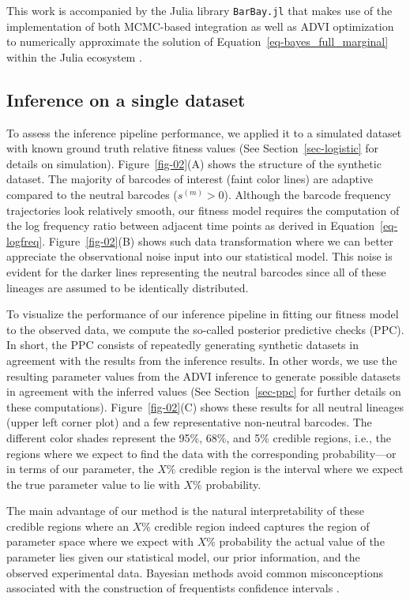 \documentclass[
]{scrartcl}
\begin{document}
\begin{refsegment}
This work is accompanied by the Julia library \texttt{BarBay.jl} that
makes use of the implementation of both MCMC-based integration as well
as ADVI optimization to numerically approximate the solution of
Equation~\ref{eq-bayes_full_marginal} within the Julia ecosystem
\autocite{ge2018}.

\hypertarget{inference-on-a-single-dataset}{%
\subsection{Inference on a single
dataset}\label{inference-on-a-single-dataset}}

To assess the inference pipeline performance, we applied it to a
simulated dataset with known ground truth relative fitness values (See
Section~\ref{sec-logistic} for details on simulation).
Figure~\ref{fig-02}(A) shows the structure of the synthetic dataset. The
majority of barcodes of interest (faint color lines) are adaptive
compared to the neutral barcodes (\(s^{(m)} > 0\)). Although the barcode
frequency trajectories look relatively smooth, our fitness model
requires the computation of the log frequency ratio between adjacent
time points as derived in Equation~\ref{eq-logfreq}.
Figure~\ref{fig-02}(B) shows such data transformation where we can
better appreciate the observational noise input into our statistical
model. This noise is evident for the darker lines representing the
neutral barcodes since all of these lineages are assumed to be
identically distributed.

To visualize the performance of our inference pipeline in fitting our
fitness model to the observed data, we compute the so-called posterior
predictive checks (PPC). In short, the PPC consists of repeatedly
generating synthetic datasets in agreement with the results from the
inference results. In other words, we use the resulting parameter values
from the ADVI inference to generate possible datasets in agreement with
the inferred values (See Section~\ref{sec-ppc} for further details on
these computations). Figure~\ref{fig-02}(C) shows these results for all
neutral lineages (upper left corner plot) and a few representative
non-neutral barcodes. The different color shades represent the 95\%,
68\%, and 5\% credible regions, i.e., the regions where we expect to
find the data with the corresponding probability---or in terms of our
parameter, the \(X\%\) credible region is the interval where we expect
the true parameter value to lie with \(X\%\) probability.

The main advantage of our method is the natural interpretability of
these credible regions where an \(X\%\) credible region indeed captures
the region of parameter space where we expect with \(X\%\) probability
the actual value of the parameter lies given our statistical model, our
prior information, and the observed experimental data. Bayesian methods
avoid common misconceptions associated with the construction of
frequentists confidence intervals \autocite{morey2016}.


\end{refsegment}
\end{document}
